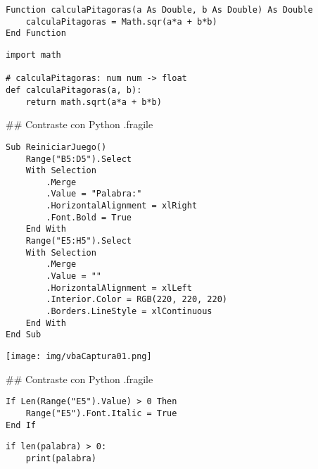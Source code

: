 
\centering {}
\begin{lstlisting}[style=vba]
Function calculaPitagoras(a As Double, b As Double) As Double
    calculaPitagoras = Math.sqr(a*a + b*b)
End Function
\end{lstlisting}

\vfill
\centering {}
\begin{lstlisting}[style=frame03]
import math

# calculaPitagoras: num num -> float
def calculaPitagoras(a, b):
    return math.sqrt(a*a + b*b)
\end{lstlisting}

## Contraste con Python {.fragile}


\bgncolumns

\centering {}
\begin{lstlisting}[style=vba]
Sub ReiniciarJuego()
    Range("B5:D5").Select
    With Selection
        .Merge
        .Value = "Palabra:"
        .HorizontalAlignment = xlRight
        .Font.Bold = True
    End With
    Range("E5:H5").Select
    With Selection
        .Merge
        .Value = ""
        .HorizontalAlignment = xlLeft
        .Interior.Color = RGB(220, 220, 220)
        .Borders.LineStyle = xlContinuous
    End With
End Sub
\end{lstlisting}


\texttt{[image: img/vbaCaptura01.png]}

\trmcolumns

## Contraste con Python {.fragile}


\bgncolumns

\centering {}
\begin{lstlisting}[style=vba]
If Len(Range("E5").Value) > 0 Then
    Range("E5").Font.Italic = True
End If
\end{lstlisting}

\centering {}
\begin{lstlisting}[style=frame03]
if len(palabra) > 0:
    print(palabra)
\end{lstlisting}

\trmcolumns

